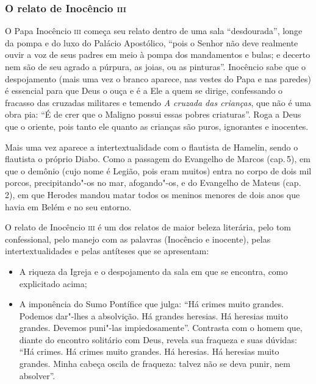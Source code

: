 \documentclass[12pt]{extarticle}
\begin{document}
\subsubsection{O relato de Inocêncio \textsc{iii}}


O Papa Inocêncio \textsc{iii} começa seu relato dentro de uma sala
``desdourada'', longe da pompa e do luxo do Palácio Apostólico, ``pois o
Senhor não deve realmente ouvir a voz de seus padres em meio à pompa dos
mandamentos e bulas; e decerto nem são de seu agrado a púrpura, as
joias, ou as pinturas''. Inocêncio sabe que o despojamento (mais
uma vez o branco aparece, nas vestes do Papa e nas paredes) é essencial
para que Deus o ouça e é a Ele a quem se dirige, confessando o fracasso
das cruzadas militares e temendo \textit{A cruzada das crianças}, que não é uma
obra pia: ``É de crer que o Maligno possui essas pobres criaturas''. Roga a Deus que o oriente, pois tanto ele quanto as crianças são
puros, ignorantes e inocentes.

Mais uma vez aparece a intertextualidade com o flautista de Hamelin,
sendo o flautista o próprio Diabo. Como a passagem do Evangelho de
Marcos (cap.\,5), em que o demônio (cujo nome é Legião, pois eram muitos)
entra no corpo de dois mil porcos, precipitando"-os no mar, afogando"-os, e
do Evangelho de Mateus (cap.\,2), em que Herodes mandou matar todos os
meninos menores de dois anos que havia em Belém e no seu entorno.

O relato de Inocêncio \textsc{iii} é um dos relatos de maior beleza literária,
pelo tom confessional, pelo manejo com as palavras (Inocêncio e
inocente), pelas intertextualidades e pelas antíteses que se
apresentam:

\begin{itemize}
\item A riqueza da Igreja e o despojamento da sala em que se encontra, como
explicitado acima;

\item A imponência do Sumo Pontífice que julga: ``Há crimes muito grandes.
Podemos dar"-lhes a absolvição. Há grandes heresias. Há heresias muito
grandes. Devemos puni"-las impiedosamente''. Contrasta com o
homem que, diante do encontro solitário com Deus, revela sua fraqueza e
suas dúvidas: ``Há crimes. Há crimes muito grandes. Há heresias. Há
heresias muito grandes. Minha cabeça oscila de fraqueza: talvez não se
deva punir, nem absolver''.
\end{itemize}

\end{document}
